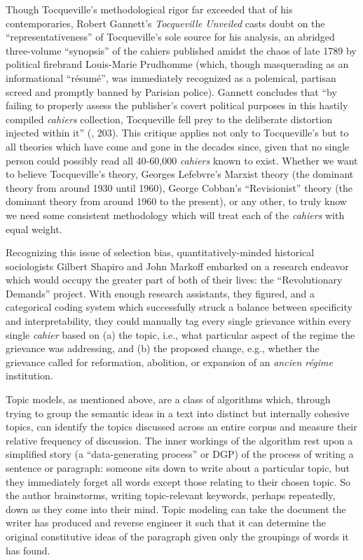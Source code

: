 Though Tocqueville's methodological rigor far exceeded that of his contemporaries, Robert Gannett's \textit{Tocqueville Unveiled} \citep{gannett_tocqueville_2003} casts doubt on the ``representativeness'' of Tocqueville's sole source for his analysis, an abridged three-volume ``synopsis'' of the cahiers published amidst the chaos of late 1789 by political firebrand Louis-Marie Prudhomme (which, though masquerading as an informational ``résumé'', was immediately recognized as a polemical, partisan screed and promptly banned by Parisian police). Gannett concludes that ``by failing to properly assess the publisher's covert political purposes in this hastily compiled \textit{cahiers} collection, Tocqueville fell prey to the deliberate distortion injected within it'' (\cite{gannett_tocqueville_2003}, 203). This critique applies not only to Tocqueville's but to all theories which have come and gone in the decades since, given that no single person could possibly read all 40-60,000 \textit{cahiers} known to exist. Whether we want to believe Tocqueville's theory, Georges Lefebvre's Marxist theory (the dominant theory from around 1930 until 1960), George Cobban's ``Revisionist'' theory (the dominant theory from around 1960 to the present), or any other, to truly know we need some consistent methodology which will treat each of the \textit{cahiers} with equal weight.

Recognizing this issue of selection bias, quantitatively-minded historical sociologists Gilbert Shapiro and John Markoff embarked on a research endeavor which would occupy the greater part of both of their lives: the ``Revolutionary Demands'' project. With enough research assistants, they figured, and a categorical coding system which successfully struck a balance between specificity and interpretability, they could manually tag every single grievance within every single \textit{cahier} based on (a) the topic, i.e., what particular aspect of the regime the grievance was addressing, and (b) the proposed change, e.g., whether the grievance called for reformation, abolition, or expansion of an \textit{ancien régime} institution. 

Topic models, as mentioned above, are a class of algorithms which, through trying to group the semantic ideas in a text into distinct but internally cohesive topics, can identify the topics discussed across an entire corpus and measure their relative frequency of discussion. The inner workings of the algorithm rest upon a simplified story (a ``data-generating process'' or DGP) of the process of writing a sentence or paragraph: someone sits down to write about a particular topic, but they immediately forget all words except those relating to their chosen topic. So the author brainstorms, writing topic-relevant keywords, perhaps repeatedly, down as they come into their mind. Topic modeling can take the document the writer has produced and reverse engineer it such that it can determine the original constitutive ideas of the paragraph given only the groupings of words it has found.

